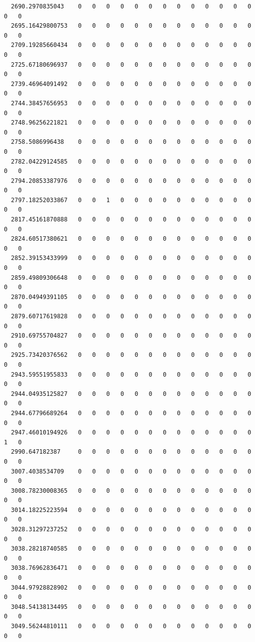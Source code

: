 \documentclass[
  letterpaper,
  DIV=11,
  numbers=noendperiod]{scrartcl}
\begin{document}
\begin{verbatim}
  2690.2970835043    0   0   0   0   0   0   0   0   0   0   0   0   0   0   0
  2695.16429800753   0   0   0   0   0   0   0   0   0   0   0   0   0   0   0
  2709.19285660434   0   0   0   0   0   0   0   0   0   0   0   0   0   0   0
  2725.67180696937   0   0   0   0   0   0   0   0   0   0   0   0   0   0   0
  2739.46964091492   0   0   0   0   0   0   0   0   0   0   0   0   0   0   0
  2744.38457656953   0   0   0   0   0   0   0   0   0   0   0   0   0   0   0
  2748.96256221821   0   0   0   0   0   0   0   0   0   0   0   0   0   0   0
  2758.5086996438    0   0   0   0   0   0   0   0   0   0   0   0   0   0   0
  2782.04229124585   0   0   0   0   0   0   0   0   0   0   0   0   0   0   0
  2794.20853387976   0   0   0   0   0   0   0   0   0   0   0   0   0   0   0
  2797.18252033867   0   0   1   0   0   0   0   0   0   0   0   0   0   0   0
  2817.45161870888   0   0   0   0   0   0   0   0   0   0   0   0   0   0   0
  2824.60517380621   0   0   0   0   0   0   0   0   0   0   0   0   0   0   0
  2852.39153433999   0   0   0   0   0   0   0   0   0   0   0   0   0   0   0
  2859.49809306648   0   0   0   0   0   0   0   0   0   0   0   0   0   0   0
  2870.04949391105   0   0   0   0   0   0   0   0   0   0   0   0   0   0   0
  2879.60717619828   0   0   0   0   0   0   0   0   0   0   0   0   0   0   0
  2910.69755704827   0   0   0   0   0   0   0   0   0   0   0   0   0   0   0
  2925.73420376562   0   0   0   0   0   0   0   0   0   0   0   0   0   0   0
  2943.59551955833   0   0   0   0   0   0   0   0   0   0   0   0   0   0   0
  2944.04935125827   0   0   0   0   0   0   0   0   0   0   0   0   0   0   0
  2944.67796689264   0   0   0   0   0   0   0   0   0   0   0   0   0   0   0
  2947.46010194926   0   0   0   0   0   0   0   0   0   0   0   0   0   1   0
  2990.647182387     0   0   0   0   0   0   0   0   0   0   0   0   0   0   0
  3007.4038534709    0   0   0   0   0   0   0   0   0   0   0   0   0   0   0
  3008.78230008365   0   0   0   0   0   0   0   0   0   0   0   0   0   0   0
  3014.18225223594   0   0   0   0   0   0   0   0   0   0   0   0   0   0   0
  3028.31297237252   0   0   0   0   0   0   0   0   0   0   0   0   0   0   0
  3038.28218740585   0   0   0   0   0   0   0   0   0   0   0   0   0   0   0
  3038.76962836471   0   0   0   0   0   0   0   0   0   0   0   0   0   0   0
  3044.97928828902   0   0   0   0   0   0   0   0   0   0   0   0   0   0   0
  3048.54138134495   0   0   0   0   0   0   0   0   0   0   0   0   0   0   0
  3049.56244810111   0   0   0   0   0   0   0   0   0   0   0   0   0   0   0

\end{verbatim}
\end{document}
